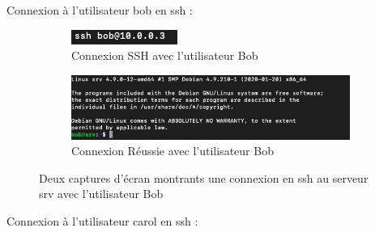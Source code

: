 \documentclass[12pt]{article}
\begin{document}
\vspace{0.3cm}

Connexion à l'utilisateur bob en ssh  : 

\vspace{0.3cm}

\begin{figure}[h]
  \centering
  \begin{subfigure}{0.30\textwidth}
    \centering
    \includegraphics[width=\textwidth]{Images-Client-SSH/Image-TD-SSH-1/SSH-Bob.png}
    \caption{Connexion SSH avec l'utilisateur Bob}
  \end{subfigure}
  \vspace{0.9cm} %
  \begin{subfigure}{0.45\textwidth}
    \centering
    \includegraphics[width=\textwidth]{Images-Client-SSH/Image-TD-SSH-1/Connexion-SSH-Bob.png}
    \caption{Connexion Réussie avec l'utilisateur Bob}
  \end{subfigure}
  \caption{Deux captures d'écran montrants une connexion en ssh au serveur srv avec l'utilisateur Bob}
\end{figure}

\vspace{0.3cm}

Connexion à l'utilisateur carol en ssh  : 

\vspace{0.3cm}
\end{document}
